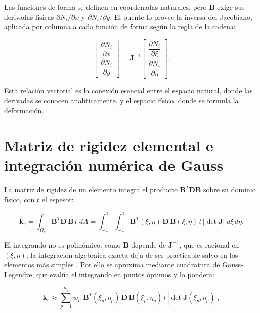 Las funciones de forma se definen en coordenadas naturales, pero $\bm{B}$ exige sus derivadas físicas $\partial N_i/\partial x$ y $\partial N_i/\partial y$. El puente lo provee la inversa del Jacobiano, aplicada por columna a cada función de forma según la regla de la cadena:

\begin{equation}
\begin{bmatrix}
\dfrac{\partial N_i}{\partial x} \\[6pt]
\dfrac{\partial N_i}{\partial y}
\end{bmatrix}
= \bm{J}^{-1}
\begin{bmatrix}
\dfrac{\partial N_i}{\partial \xi} \\[6pt]
\dfrac{\partial N_i}{\partial \eta}
\end{bmatrix}.
\label{eq:fisica-natural}
\end{equation}

Esta relación vectorial es la conexión esencial entre el espacio natural, donde las derivadas se conocen analíticamente, y el espacio físico, donde se formula la deformación.

\section{Matriz de rigidez elemental e integración numérica de Gauss}
\label{sec:rigidez-gauss}

La matriz de rigidez de un elemento integra el producto $\bm{B}^T\bm{D}\bm{B}$ sobre su dominio físico, con $t$ el espesor:

\begin{equation}
\bm{k}_e = \int_{\Omega_e} \bm{B}^T \bm{D}\, \bm{B}\, t \; dA
= \int_{-1}^{1}\!\!\int_{-1}^{1} \bm{B}^T(\xi,\eta)\,\bm{D}\,\bm{B}(\xi,\eta)\, t\, |\det\bm{J}|\; d\xi\, d\eta.
\label{eq:ke-integral}
\end{equation}

El integrando no es polinómico: como $\bm{B}$ depende de $\bm{J}^{-1}$, que es racional en $(\xi,\eta)$, la integración algebraica exacta deja de ser practicable salvo en los elementos más simples \autocites[p.~147]{zienkiewicz2013fem}[p.~191]{hughes2000fem}. Por ello se aproxima mediante cuadratura de Gauss-Legendre, que evalúa el integrando en puntos óptimos y lo pondera:

\begin{equation}
\bm{k}_e \approx \sum_{p=1}^{n_g} w_p\; \bm{B}^T(\xi_p,\eta_p)\,\bm{D}\,\bm{B}(\xi_p,\eta_p)\, t\, |\det\bm{J}(\xi_p,\eta_p)|,
\label{eq:ke-gauss}
\end{equation}

